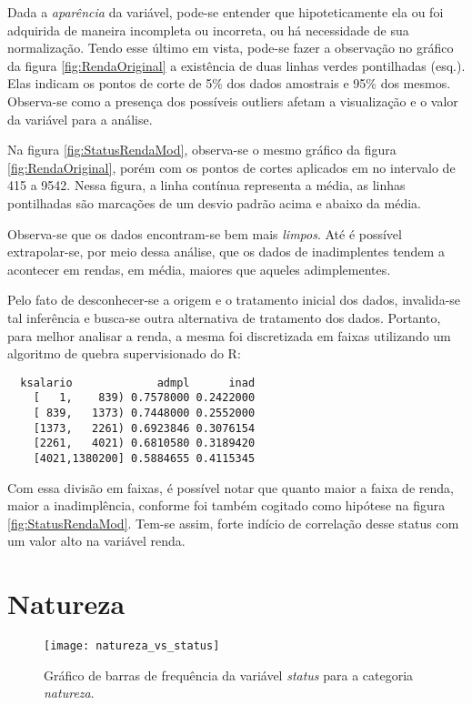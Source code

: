 Dada a \emph{aparência} da variável, pode-se entender que hipoteticamente ela ou foi adquirida de maneira incompleta ou 
incorreta, ou há necessidade de sua normalização. Tendo esse último em vista, pode-se fazer a observação no gráfico da figura 
\ref{fig:RendaOriginal} a existência de duas linhas verdes pontilhadas (esq.). Elas indicam os pontos de corte de 5\% dos dados amostrais e 95\% dos mesmos. Observa-se como a presença dos possíveis outliers afetam a visualização e o valor da variável para a análise.

Na figura \ref{fig:StatusRendaMod}, observa-se o mesmo gráfico da figura \ref{fig:RendaOriginal}, porém com os pontos de cortes aplicados em no intervalo de 415 a 9542. Nessa figura, a linha contínua representa a média, as linhas pontilhadas são marcações de um desvio padrão acima e abaixo da média.

Observa-se que os dados encontram-se bem mais \emph{limpos}. Até é possível extrapolar-se, por meio dessa análise, que os dados de inadimplentes tendem a acontecer em rendas, em média, maiores que aqueles adimplementes. 

Pelo fato de desconhecer-se a origem e o tratamento inicial dos dados, invalida-se tal inferência e busca-se outra alternativa de tratamento dos dados. Portanto, para melhor analisar a renda, a mesma foi discretizada em faixas utilizando
um algoritmo de quebra supervisionado do R:

\begin{minipage}{\linewidth}
\begin{lstlisting}
  ksalario             admpl      inad
    [   1,    839) 0.7578000 0.2422000
    [ 839,   1373) 0.7448000 0.2552000
    [1373,   2261) 0.6923846 0.3076154
    [2261,   4021) 0.6810580 0.3189420
    [4021,1380200] 0.5884655 0.4115345
\end{lstlisting}
\end{minipage}

Com essa divisão em faixas, é possível notar que quanto maior a faixa
de renda, maior a inadimplência, conforme foi também cogitado como hipótese na 
figura \ref{fig:StatusRendaMod}. Tem-se assim, forte indício de correlação desse status com um valor alto na variável renda.

\clearpage

\section{Natureza}

\begin{center}
\begin{figure}[h]
\begin{centering}
\texttt{[image: natureza\_vs\_status]}
\par\end{centering}
\caption{\label{fig:FreqStatusVsNatureza}Gráfico de barras de frequência da
  variável \emph{status} para a categoria \emph{natureza}.}
\end{figure}
\vspace*{-40pt}
\par\end{center}

